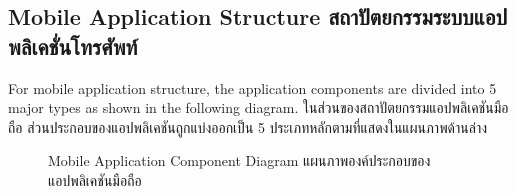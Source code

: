 \subsection{\ifenglish Mobile Application Structure \else สถาปัตยกรรมระบบแอปพลิเคชั่นโทรศัพท์ \fi}

\ifenglish
For mobile application structure, the application components are divided into 5 major types as shown in the following diagram.
\else
ในส่วนของสถาปัตยกรรมแอปพลิเคชันมือถือ ส่วนประกอบของแอปพลิเคชันถูกแบ่งออกเป็น 5 ประเภทหลักตามที่แสดงในแผนภาพด้านล่าง
\fi

\begin{figure}[ht]
    \begin{center}
    \end{center}
    \newcommand{\MobileAppComponentDiagram}{\ifenglish Mobile Application Component Diagram \else แผนภาพองค์ประกอบของแอปพลิเคชันมือถือ \fi}
    \caption[\MobileAppComponentDiagram]{\MobileAppComponentDiagram}
    \label{fig:mobile app component diagram}
\end{figure}

